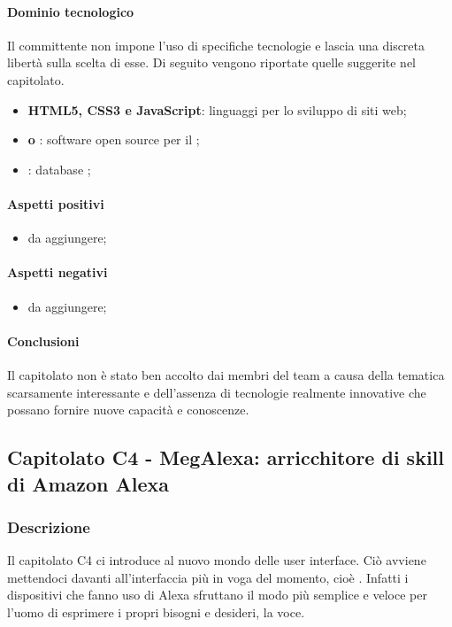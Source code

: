 	\paragraph{Dominio tecnologico} \Spazio
	Il committente non impone l'uso di specifiche tecnologie e lascia una discreta libertà sulla scelta di esse. Di seguito vengono riportate quelle suggerite nel capitolato.
	\begin{itemize}
		\item \textbf{HTML5, CSS3 e JavaScript}: linguaggi per lo sviluppo di siti web;
		\item \textbf{ o }: software open source per il ;
		\item  \textbf{}: database ;
	\end{itemize}
	
	\paragraph{Aspetti positivi}
	\begin{itemize}
		\item {da aggiungere;}
	\end{itemize} 
	\paragraph{Aspetti negativi} 
	\begin{itemize}
	\item {da aggiungere;}
	\end{itemize} 
	\paragraph{Conclusioni} \Spazio
	Il capitolato non è stato ben accolto dai membri del team a causa della tematica scarsamente interessante e dell'assenza di tecnologie realmente innovative che possano fornire nuove capacità e conoscenze.
	
	
	\subsection{Capitolato C4 - MegAlexa: arricchitore di skill di Amazon Alexa}
	\subsubsection{Descrizione}	
		Il capitolato C4 ci introduce al nuovo mondo delle user interface. Ciò avviene mettendoci davanti all’interfaccia più in voga del momento, cioè . Infatti i dispositivi che fanno uso di Alexa sfruttano il modo più semplice e veloce per l’uomo di esprimere i propri bisogni e desideri, la voce. 
